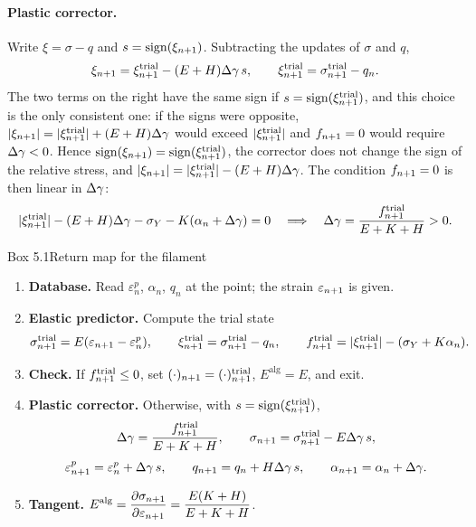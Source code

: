 \paragraph{Plastic corrector.}
Write $\xi=\sigma-q$ and $s=\operatorname{sign}(\xi_{n+1})$. Subtracting the updates of
$\sigma$ and $q$,
\[
  \xi_{n+1}=\xi^{\mathrm{trial}}_{n+1}-(E+H)\Delta\gamma\,s,\qquad \xi^{\mathrm{trial}}_{n+1}=\sigma^{\mathrm{trial}}_{n+1}-q_n .
\]
The two terms on the right have the same sign if $s=\operatorname{sign}(\xi^{\mathrm{trial}}_{n+1})$,
and this choice is the only consistent one: if the signs were opposite,
$|\xi_{n+1}|=|\xi^{\mathrm{trial}}_{n+1}|+(E+H)\Delta\gamma$ would exceed $|\xi^{\mathrm{trial}}_{n+1}|$ and $f_{n+1}=0$ would require
$\Delta\gamma<0$. Hence $\operatorname{sign}(\xi_{n+1})=\operatorname{sign}(\xi^{\mathrm{trial}}_{n+1})$, the corrector does not
change the sign of the relative stress, and
$|\xi_{n+1}|=|\xi^{\mathrm{trial}}_{n+1}|-(E+H)\Delta\gamma$. The condition $f_{n+1}=0$ is then linear in
$\Delta\gamma$:
\begin{equation}\label{eq:pn-dg1d}
  |\xi^{\mathrm{trial}}_{n+1}|-(E+H)\Delta\gamma-\sigma_{Y}-K(\alpha_n+\Delta\gamma)=0
  \quad\Longrightarrow\quad
  \Delta\gamma=\frac{f^{\mathrm{trial}}_{n+1}}{E+K+H}>0 .
\end{equation}

\begin{gbox}{Box 5.1\quad Return map for the filament}
%
\begin{enumerate}[label=\textbf{\arabic*.},leftmargin=1.6em]
  \item \textbf{Database.} Read $\varepsilon^p_n$, $\alpha_n$, $q_n$ at the
  point; the strain $\varepsilon_{n+1}$ is given.
  \item \textbf{Elastic predictor.} Compute the trial state
  \[
    \sigma^{\mathrm{trial}}_{n+1}=E(\varepsilon_{n+1}-\varepsilon^p_n),\qquad
    \xi^{\mathrm{trial}}_{n+1}=\sigma^{\mathrm{trial}}_{n+1}-q_n,\qquad
    f^{\mathrm{trial}}_{n+1}=|\xi^{\mathrm{trial}}_{n+1}|-(\sigma_{Y}+K\alpha_n).
  \]
  \item \textbf{Check.} If $f^{\mathrm{trial}}_{n+1}\le0$, set $(\cdot)_{n+1}=(\cdot)^{\mathrm{trial}}_{n+1}$,
  $E^{\mathrm{alg}}=E$, and exit.
  \item \textbf{Plastic corrector.} Otherwise, with $s=\operatorname{sign}(\xi^{\mathrm{trial}}_{n+1})$,
  \[
    \Delta\gamma=\frac{f^{\mathrm{trial}}_{n+1}}{E+K+H},\qquad
    \sigma_{n+1}=\sigma^{\mathrm{trial}}_{n+1}-E\Delta\gamma\,s,
  \]
  \[
    \varepsilon^p_{n+1}=\varepsilon^p_n+\Delta\gamma\,s,\qquad
    q_{n+1}=q_n+H\Delta\gamma\,s,\qquad
    \alpha_{n+1}=\alpha_n+\Delta\gamma .
  \]
  \item \textbf{Tangent.}
  $\displaystyle E^{\mathrm{alg}}=\frac{\partial\sigma_{n+1}}{\partial\varepsilon_{n+1}}=\frac{E(K+H)}{E+K+H}$.
\end{enumerate}
\end{gbox}

